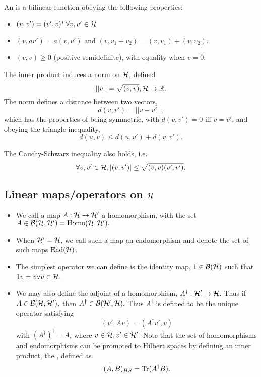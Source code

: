 \begin{defn}
    An  is a bilinear function obeying the following properties:
    \begin{itemize}
        \item $(v,v')=(v',v)^* \,\forall v,v' \in \mathcal H$
        \item $(v,av')=a(v,v')$ and $(v,v_1+v_2)=(v,v_1)+(v,v_2)$.
        \item $(v,v)\geq 0$  (positive semidefinite), with equality when $v=0.$
    \end{itemize}
\end{defn}
The inner product induces a norm on $\mathcal H$, defined
\begin{equation}
    ||v||=\sqrt{(v,v)}, \mathcal H \to \mathbb{R}.
\end{equation}
The norm defines a distance between two vectors,
\begin{equation}
    d(v,v')=||v-v'||,
\end{equation}
which has the properties of being symmetric, with $d(v,v')=0$ iff $v=v'$, and obeying the triangle inequality, 
\begin{equation}
    d(u,v) \leq d(u,v') + d(v,v').
\end{equation}

The Cauchy-Schwarz inequality also holds, i.e.
\begin{equation}
    \forall v, v' \in \mathcal H, |(v,v')|\leq \sqrt{(v,v) (v',v')}.
\end{equation}

\subsection*{Linear maps/operators on $\mathcal H$}
\begin{itemize}
    \item We call a map $A:\mathcal H \to \mathcal H'$ a homomorphism, with the set $A\in \mathcal{B}(\mathcal H, \mathcal H')=\text{Homo}(\mathcal H, \mathcal H').$
    \item When $\mathcal H' = \mathcal H$, we call such a map an endomorphism and denote the set of such maps $\text{End}(\mathcal H)$.
    \item The simplest operator we can define is the identity map, $1\in \mathcal{B}(\mathcal H)$ such that $1v = v \forall v\in \mathcal H$.
    \item We may also define the adjoint of a homomorphism, $A^\dagger: \mathcal H' \to \mathcal H$. Thus if $A\in \mathcal{B}(\mathcal H, \mathcal H'),$ then $A^\dagger \in \mathcal{B}(\mathcal H',\mathcal H).$ Thus $A^\dagger$ is defined to be the unique operator satisfying
    \begin{equation}
        (v',Av) = (A^\dagger v',v)
    \end{equation}
    with $(A^\dagger)^\dagger = A$, where $v\in \mathcal H, v' \in \mathcal H'.$ Note that the set of homomorphisms and endomorphisms can be promoted to Hilbert spaces by defining an inner product, the , defined as
    \begin{equation}
        (A,B)_{HS}=\operatorname{Tr}(A^\dagger B).
    \end{equation}
\end{itemize}

